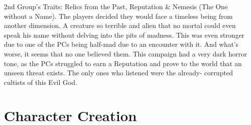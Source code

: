 \begin{multicols}{2}
\begin{mog}
2nd Group's Traits: Relics from the Past, Reputation
\& Nemesis (The One without a Name). The players
decided they would face a timeless being from another
dimension. A creature so terrible and alien that no mortal
could even speak his name without delving into the pits
of madness. This was even stronger due to one of the PCs
being half-mad due to an encounter with it. And what’s
worse, it seems that no one believed them. This campaign
had a very dark horror tone, as the PCs struggled to earn
a Reputation and prove to the world that an unseen threat
exists. The only ones who listened were the already-
corrupted cultists of this Evil God.
\end{mog}
\end{multicols}

\section{Character Creation}
